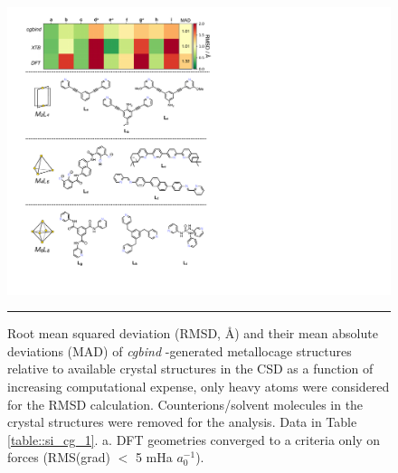 \documentclass[../../main.tex]{subfiles}
\newcommand{\cgbind}{\emph{cgbind }}
\begin{document}
\begin{figure}[h!]
	\vspace{0.4cm}
	\centering
	\includegraphics[width=13.2cm]{3/cgbind/figs/fig6/fig6}
	\vspace{0.2cm}
	\hrule
	\caption{Root mean squared deviation (RMSD, \AA) and their mean absolute deviations (MAD) of \cgbind-generated metallocage structures relative to available crystal structures in the CSD as a function of increasing computational expense, only heavy atoms were considered for the RMSD calculation. Counterions/solvent molecules in the crystal structures were removed for the analysis. Data in Table \ref{table::si_cg_1}. a. DFT geometries converged to a criteria only on forces (RMS(grad) $<$ 5 mHa $a_0^{-1}$).}
	\label{fig::cg_6}
\end{figure}

\clearpage
\end{document}
